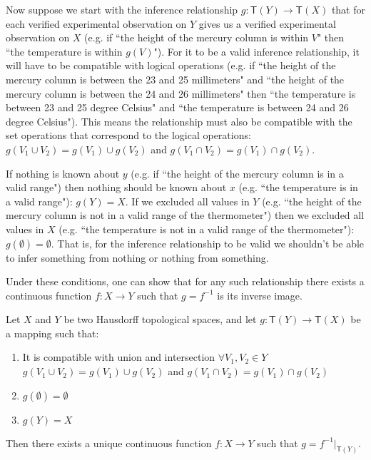 \documentclass[11pt,letterpaper,fleqn]{memoir} %
\begin{document}
Now suppose we start with the inference relationship $g  : \mathsf{T}(Y) \rightarrow \mathsf{T}(X)$ that for each verified experimental observation on $Y$ gives us a verified experimental observation on $X$ (e.g. if ``the height of the mercury column is within $V$" then ``the temperature is within $g(V)$"). For it to be a valid inference relationship, it will have to be compatible with logical operations (e.g. if ``the height of the mercury column is between the 23 and 25 millimeters" and ``the height of the mercury column is between the 24 and 26 millimeters" then ``the temperature is between 23 and 25 degree Celsius" and  ``the temperature is between 24 and 26 degree Celsius"). This means the relationship must also be compatible with the set operations that correspond to the logical operations: $g(V_1 \cup V_2)=g(V_1)\cup g(V_2)$ and $g(V_1 \cap V_2)=g(V_1)\cap g(V_2)$.

If nothing is known about $y$ (e.g. if ``the height of the mercury column is in a valid range") then nothing should be known about $x$ (e.g. ``the temperature is in a valid range"): $g(Y)=X$. If we excluded all values in $Y$ (e.g. ``the height of the mercury column is not in a valid range of the thermometer") then we excluded all values in $X$ (e.g. ``the temperature is not in a valid range of the thermometer"): $g(\emptyset) = \emptyset$. That is, for the inference relationship to be valid we shouldn't be able to infer something from nothing or nothing from something.

Under these conditions, one can show that for any such relationship there exists a continuous function $f: X \rightarrow Y$ such that $g=f^{-1}$ is its inverse image.

\begin{prop}
	\label{setfunctions}
	Let $X$ and $Y$ be two Hausdorff topological spaces, and let $g: \mathsf{T}(Y) \rightarrow \mathsf{T}(X)$ be a mapping such that:
	\begin{enumerate}
		\item It is compatible with union and intersection $\forall V_1, V_2 \in Y$ $g(V_1 \cup V_2)=g(V_1)\cup g(V_2)$ and $g(V_1 \cap V_2)=g(V_1)\cap g(V_2)$
		\item $g(\emptyset) = \emptyset$
		\item $g(Y) = X$
	\end{enumerate}
	Then there exists a unique continuous function $f: X \rightarrow Y$ such that $g = f^{-1} |_{\mathsf{T}(Y)}$.
\end{prop}
\end{document}
